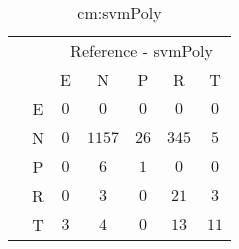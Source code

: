 \begin{table}[!ht]
	\centering
	\begin{tabular}{|c|c|c|c|c|c|c|}
		\cline{3-7}
		\multicolumn{2}{c|}{} & \multicolumn{5}{|c|}{Reference - svmPoly} \\ \cline{3-7}
		\multicolumn{2}{c|}{} & E & N & P & R & T \\ \hline
		\multirow{5}{*}{\rotatebox{90}{Prediction}} & E & $0$ & $0$ & $0$ & $0$ & $0$ \\ \cline{2-7}
		 & N & $0$ & $1157$ & $26$ & $345$ & $5$ \\ \cline{2-7}
		 & P & $0$ & $6$ & $1$ & $0$ & $0$ \\ \cline{2-7}
		 & R & $0$ & $3$ & $0$ & $21$ & $3$ \\ \cline{2-7}
		 & T & $3$ & $4$ & $0$ & $13$ & $11$ \\ \hline
	\end{tabular}
	\caption{cm:svmPoly}
	\label{tab:cm:svmPoly}
\end{table}

